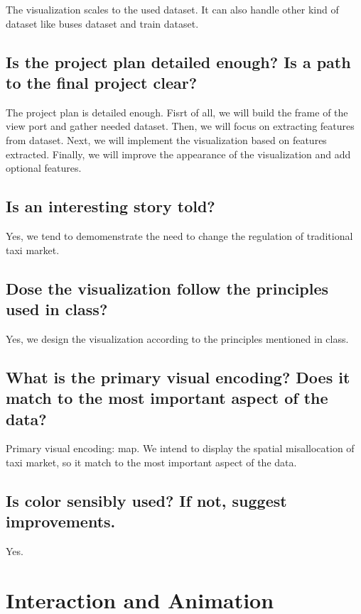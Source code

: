 \documentclass{article}
\begin{document}
    The visualization scales to the used dataset. It can also handle other kind of dataset like buses dataset and train dataset.

    \subsection{Is the project plan detailed enough? Is a path to the final project clear?}

    The project plan is detailed enough. Fisrt of all, we will build the frame of the view port and gather needed dataset. Then, we will
    focus on extracting features from dataset. Next, we will implement the visualization based on features extracted. Finally, we will improve 
    the appearance of the visualization and add optional features.

    \subsection{Is an interesting story told?}

    Yes, we tend to demomenstrate the need to change the regulation of traditional taxi market.

    \subsection{Dose the visualization follow the principles used in class?}

    Yes, we design the visualization according to the principles mentioned in class.

    \subsection{What is the primary visual encoding? Does it match to the most important aspect of the data?}

    Primary visual encoding: map. We intend to display the spatial misallocation of taxi market, so it match to the most important aspect of the data.

    \subsection{Is color sensibly used? If not, suggest improvements.}

    Yes.

    \section{Interaction and Animation}
\end{document}
